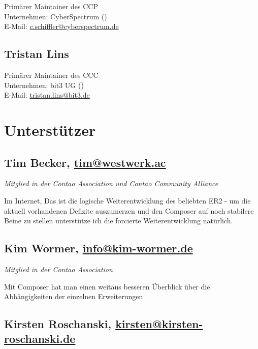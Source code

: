 \documentclass[
paper=a4,
draft=false,%
fontsize=10pt%
]{scrartcl}
\begin{document}
Primärer Maintainer des CCP \\
Unternehmen: CyberSpectrum () \\
E-Mail: \href{mailto:c.schiffler@cyberspectrum.de}{c.schiffler@cyberspectrum.de}

\subsection*{Tristan  Lins}

Primärer Maintainer des CCC \\
Unternehmen: bit3 UG () \\
E-Mail: \href{mailto:tristan.lins@bit3.de}{tristan.lins@bit3.de}

%
%

\newpage

\section{Unterstützer}

\subsection*{Tim  Becker, \href{mailto:tim@westwerk.ac}{tim@westwerk.ac}}

\emph{Mitglied in der Contao Association und Contao Community Alliance}

Im Internet, Das  ist die logische Weiterentwicklung des beliebten ER2 - um die aktuell vorhandenen Defizite auszumerzen und den Composer auf noch stabilere Beine zu stellen unterstütze ich die forcierte Weiterentwicklung natürlich.

\subsection*{Kim  Wormer, \href{mailto:info@kim-wormer.de}{info@kim-wormer.de}}

\emph{Mitglied in der Contao Association}

Mit Composer hat man einen weitaus besseren Überblick über die Abhängigkeiten der einzelnen Erweiterungen

\subsection*{Kirsten  Roschanski, \href{mailto:kirsten@kirsten-roschanski.de}{kirsten@kirsten-roschanski.de}}
\end{document}
